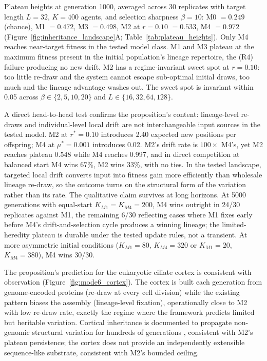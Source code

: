\documentclass[aps,prx,reprint,amsmath,amssymb,floatfix,superscriptaddress,nofootinbib]{revtex4-2}
\theoremstyle{plain-thm}
\theoremstyle{definition-thm}
\begin{document}
Plateau heights at generation 1000, averaged across 30 replicates with target length $L = 32$, $K = 400$ agents, and selection sharpness $\beta = 10$: M0 $= 0.249$ (chance), M1 $= 0.472$, M3 $= 0.498$, M2 at $r = 0.10$ $= 0.533$, M4 $= 0.972$ (Figure~\ref{fig:inheritance_landscape}A; Table~\ref{tab:plateau_heights}). Only M4 reaches near-target fitness in the tested model class. M1 and M3 plateau at the maximum fitness present in the initial population's lineage repertoire, the (R4) failure producing no new drift. M2 has a regime-invariant sweet spot at $r = 0.10$: too little re-draw and the system cannot escape sub-optimal initial draws, too much and the lineage advantage washes out. The sweet spot is invariant within 0.05 across $\beta \in \{2, 5, 10, 20\}$ and $L \in \{16, 32, 64, 128\}$.

A direct head-to-head test confirms the proposition's content: lineage-level re-draws and individual-level local drift are not interchangeable input sources in the tested model. M2 at $r^* = 0.10$ introduces 2.40 expected new positions per offspring; M4 at $\mu^* = 0.001$ introduces 0.02. M2's drift rate is $100\times$ M4's, yet M2 reaches plateau 0.548 while M4 reaches 0.997, and in direct competition at balanced start M4 wins 67\%, M2 wins 33\%, with no ties. In the tested landscape, targeted local drift converts input into fitness gain more efficiently than wholesale lineage re-draw, so the outcome turns on the structural form of the variation rather than its rate. The qualitative claim survives at long horizons. At 5000 generations with equal-start $K_{M1} = K_{M4} = 200$, M4 wins outright in 24/30 replicates against M1, the remaining 6/30 reflecting cases where M1 fixes early before M4's drift-and-selection cycle produces a winning lineage; the limited-heredity plateau is durable under the tested update rules, not a transient. At more asymmetric initial conditions ($K_{M1} = 80$, $K_{M4} = 320$ or $K_{M1} = 20$, $K_{M4} = 380$), M4 wins 30/30.

The proposition's prediction for the eukaryotic ciliate cortex is consistent with observation (Figure~\ref{fig:mode6_cortex}). The cortex is built each generation from genome-encoded proteins (re-draw at every cell division) while the existing pattern biases the assembly (lineage-level fixation), operationally close to M2 with low re-draw rate, exactly the regime where the framework predicts limited but heritable variation. Cortical inheritance is documented to propagate non-genomic structural variation for hundreds of generations \citep{BeissonSonneborn1965}, consistent with M2's plateau persistence; the cortex does not provide an independently extensible sequence-like substrate, consistent with M2's bounded ceiling.
\end{document}
